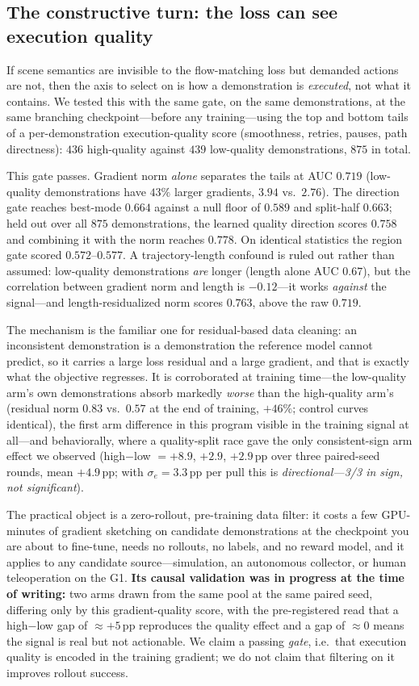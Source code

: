 \subsection{The constructive turn: the loss can see execution quality}
\label{sec:grad_q6}
If scene semantics are invisible to the flow-matching loss but demanded actions
are not, then the axis to select on is how a demonstration is \emph{executed},
not what it contains. We tested this with the same gate, on the same
demonstrations, at the same branching checkpoint---before any training---using
the top and bottom tails of a per-demonstration execution-quality score
(smoothness, retries, pauses, path directness): $436$ high-quality against
$439$ low-quality demonstrations, $875$ in total.

This gate passes. Gradient norm \emph{alone} separates the tails at AUC $0.719$
(low-quality demonstrations have $43\%$ larger gradients, $3.94$ vs.\ $2.76$).
The direction gate reaches best-mode $0.664$ against a null floor of $0.589$ and
split-half $0.663$; held out over all $875$ demonstrations, the learned quality
direction scores $0.758$ and combining it with the norm reaches $0.778$. On
identical statistics the region gate scored $0.572$--$0.577$. A
trajectory-length confound is ruled out rather than assumed: low-quality
demonstrations \emph{are} longer (length alone AUC $0.67$), but the correlation
between gradient norm and length is $-0.12$---it works \emph{against} the
signal---and length-residualized norm scores $0.763$, above the raw $0.719$.

The mechanism is the familiar one for residual-based data cleaning: an
inconsistent demonstration is a demonstration the reference model cannot
predict, so it carries a large loss residual and a large gradient, and that is
exactly what the objective regresses. It is corroborated at training time---the
low-quality arm's own demonstrations absorb markedly \emph{worse} than the
high-quality arm's (residual norm $0.83$ vs.\ $0.57$ at the end of training,
$+46\%$; control curves identical), the first arm difference in this program
visible in the training signal at all---and behaviorally, where a
quality-split race gave the only consistent-sign arm effect we observed
(high$-$low $= +8.9$, $+2.9$, $+2.9$\,pp over three paired-seed rounds, mean
$+4.9$\,pp; with $\sigma_e{=}3.3$\,pp per pull this is
\emph{directional---3/3 in sign, not significant}).

The practical object is a zero-rollout, pre-training data filter: it costs a few
GPU-minutes of gradient sketching on candidate demonstrations at the checkpoint
you are about to fine-tune, needs no rollouts, no labels, and no reward model,
and it applies to any candidate source---simulation, an autonomous collector, or
human teleoperation on the G1. \textbf{Its causal validation was in progress at
the time of writing:} two arms drawn from the same pool at the same paired seed,
differing only by this gradient-quality score, with the pre-registered read that
a high$-$low gap of $\approx$$+5$\,pp reproduces the quality effect and a gap of
$\approx$$0$ means the signal is real but not actionable. We claim a passing
\emph{gate}, i.e.\ that execution quality is encoded in the training gradient;
we do not claim that filtering on it improves rollout success.

